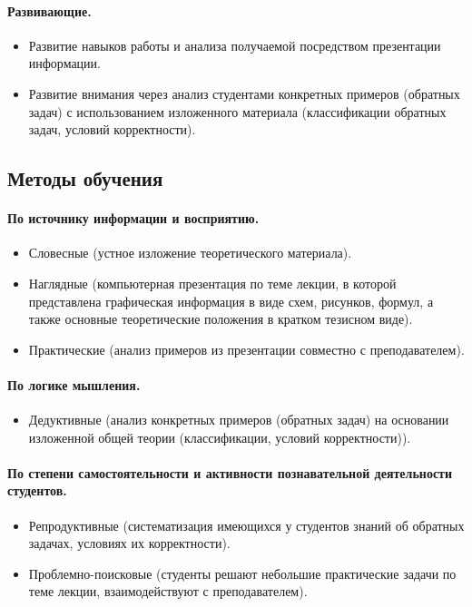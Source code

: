 \begin{refsection}
    \paragraph{Развивающие.} \begin{itemize}
        \item Развитие навыков работы и анализа получаемой посредством презентации информации.
        \item Развитие внимания через анализ студентами конкретных примеров (обратных задач) с использованием изложенного материала (классификации обратных задач, условий корректности).
    \end{itemize}

\subsection{Методы обучения}

    \paragraph{По источнику информации и восприятию.} \begin{itemize}
        \item Словесные (устное изложение теоретического материала).
        \item Наглядные (компьютерная презентация по теме лекции, в которой представлена графическая информация в виде схем, рисунков, формул, а также основные теоретические положения в кратком тезисном виде).
        \item Практические (анализ примеров из презентации совместно с преподавателем).
    \end{itemize}

    \paragraph{По логике мышления.} \begin{itemize}
        \item Дедуктивные (анализ конкретных примеров (обратных задач) на основании изложенной общей теории (классификации, условий корректности)).
    \end{itemize}

    \paragraph{По степени самостоятельности и активности познавательной деятельности студентов.} \begin{itemize}
        \item Репродуктивные (систематизация имеющихся у студентов знаний об обратных задачах, условиях их корректности).
        \item Проблемно-поисковые (студенты решают небольшие практические задачи по теме лекции, взаимодействуют с преподавателем).
    \end{itemize}


\end{refsection}
